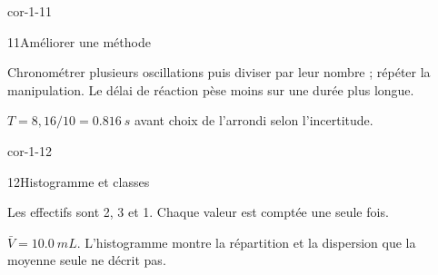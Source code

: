 \begin{blocLivre}{cor-1-11}\begin{corrige}{11}{Améliorer une méthode}
\begin{questions}
\item Chronométrer plusieurs oscillations puis diviser par leur nombre ; répéter la manipulation. Le délai de réaction pèse moins sur une durée plus longue.
\item $T=8,16/10=\qty{0,816}{s}$ avant choix de l’arrondi selon l’incertitude.
\end{questions}
\end{corrige}\end{blocLivre}
\begin{blocLivre}{cor-1-12}\begin{corrige}{12}{Histogramme et classes}
\begin{questions}
\item Les effectifs sont 2, 3 et 1. Chaque valeur est comptée une seule fois.
\item $\bar V=\qty{10,0}{mL}$. L’histogramme montre la répartition et la dispersion que la moyenne seule ne décrit pas.
\end{questions}
\end{corrige}\end{blocLivre}

